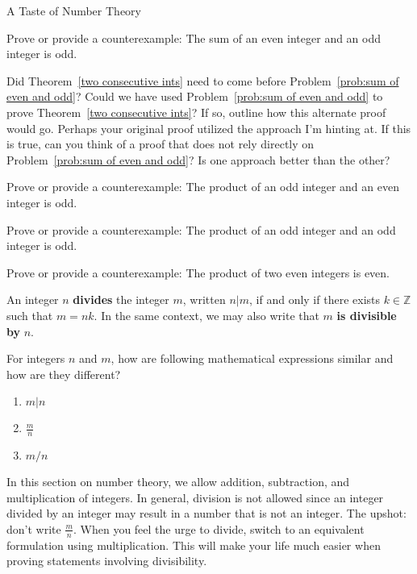 \begin{section}{A Taste of Number Theory}
\begin{problem}\label{prob:sum of even and odd}
Prove or provide a counterexample:  The sum of an even integer and an odd integer is odd.
\end{problem}

\begin{question}
Did Theorem~\ref{two consecutive ints} need to come before Problem~\ref{prob:sum of even and odd}?  Could we have used Problem~\ref{prob:sum of even and odd} to prove Theorem~\ref{two consecutive ints}?  If so, outline how this alternate proof would go.  Perhaps your original proof utilized the approach I'm hinting at.  If this is true, can you think of a proof that does not rely directly on Problem~\ref{prob:sum of even and odd}?  Is one approach better than the other?
\end{question}

\begin{problem}
Prove or provide a counterexample: The product of an odd integer and an even integer is odd.
\end{problem}

\begin{problem}
Prove or provide a counterexample: The product of an odd integer and an odd integer is odd.
\end{problem}

\begin{problem}
Prove or provide a counterexample: The product of two even integers is even.
\end{problem}

\begin{definition}
An integer $n$ \textbf{divides} the integer $m$, written $n|m$, if and only if there exists $k\in\mathbb{Z}$ such that $m=nk$. In the same context, we may also write that $m$ \textbf{is divisible by} $n$.
\end{definition}

\begin{question}
For integers $n$ and $m$, how are following mathematical expressions similar and how are they different?
\begin{enumerate}[label=\textrm{(\alph*)}]
\item $m|n$
\item $\displaystyle \frac{m}{n}$
\item $m/n$
\end{enumerate}
\end{question}

In this section on number theory, we allow addition, subtraction, and multiplication of integers.  In general, division is not allowed since an integer divided by an integer may result in a number that is not an integer. The upshot: don't write $\frac{m}{n}$.  When you feel the urge to divide, switch to an equivalent formulation using multiplication. This will make your life much easier when proving statements involving divisibility.


\end{section}
